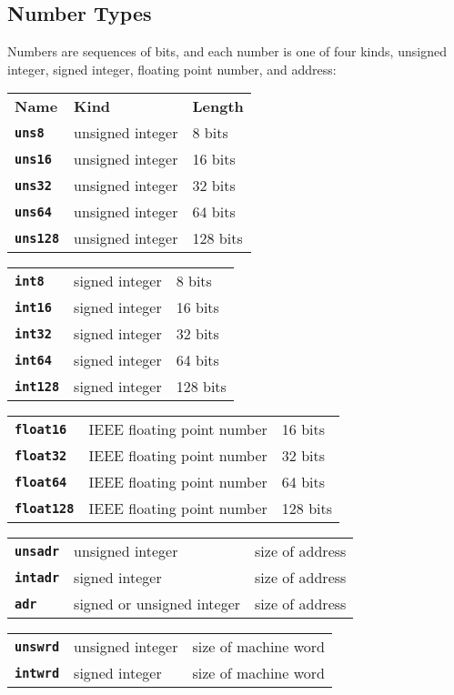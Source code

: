 \documentclass[12pt]{article}
\makeatletter
\newcommand{\TT}[1]{{\tt \bfseries #1}}
\newcommand{\ttkey}[1]{\TT{#1}\index{#1@{\tt #1}}}
\newenvironment{indpar}[1][0.3in]%
	{\begin{list}{}%
		     {\setlength{\itemsep}{0in}%
		      \setlength{\topsep}{0in}%
		      \setlength{\parsep}{1ex}%
		      \setlength{\labelwidth}{#1}%
		      \setlength{\leftmargin}{#1}%
		      \addtolength{\leftmargin}{\labelsep}}%
	 \item}%
	{\end{list}}
\makeatother
\begin{document}
\subsection{Number Types}
\label{NUMBER-TYPES}

Numbers are sequences of bits, and each number is one of
four kinds, unsigned integer, signed integer, floating point number,
and address:

\begin{indpar}
\begin{tabular}{p{1in}@{~~~~~~}p{2in}@{~~~~~~}l}
\bf Name & \bf Kind & \bf Length \\[2ex]
\ttkey{uns8}		& unsigned integer & 8 bits \\
\ttkey{uns16}		& unsigned integer & 16 bits \\
\ttkey{uns32}		& unsigned integer & 32 bits \\
\ttkey{uns64}		& unsigned integer & 64 bits \\
\ttkey{uns128}		& unsigned integer & 128 bits
\end{tabular}

\begin{tabular}{p{1in}@{~~~~~~}p{2in}@{~~~~~~}l}
\ttkey{int8}		& signed integer & 8 bits \\
\ttkey{int16}		& signed integer & 16 bits \\
\ttkey{int32}		& signed integer & 32 bits \\
\ttkey{int64}		& signed integer & 64 bits \\
\ttkey{int128}		& signed integer & 128 bits
\end{tabular}

\begin{tabular}{p{1in}@{~~~~~~}p{2in}@{~~~~~~}l}
\ttkey{float16}		& IEEE floating point number & 16 bits \\
\ttkey{float32}		& IEEE floating point number & 32 bits \\
\ttkey{float64}		& IEEE floating point number & 64 bits \\
\ttkey{float128}	& IEEE floating point number & 128 bits
\end{tabular}

\begin{tabular}{p{1in}@{~~~~~~}p{2in}@{~~~~~~}l}
\ttkey{unsadr}		& unsigned integer & size of address \\
\ttkey{intadr}		& signed integer & size of address \\
\ttkey{adr}		& signed or unsigned integer & size of address \\
\end{tabular}

\begin{tabular}{p{1in}@{~~~~~~}p{2in}@{~~~~~~}l}
\ttkey{unswrd}		& unsigned integer & size of machine word \\
\ttkey{intwrd}		& signed integer & size of machine word \\
\end{tabular}
\end{indpar}
\end{document}
